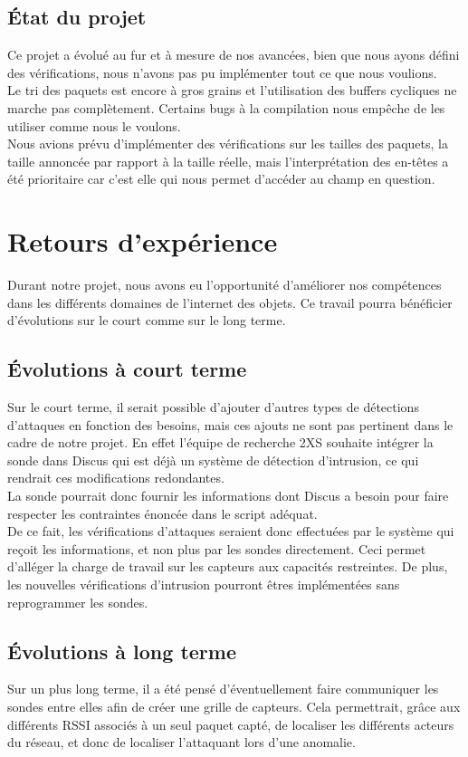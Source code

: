 	\subsection{État du projet}
		Ce projet a évolué au fur et à mesure de nos avancées, bien que nous ayons défini des vérifications, nous n'avons pas pu implémenter tout ce que nous voulions.\\
		Le tri des paquets est encore à gros grains et l'utilisation des buffers cycliques ne marche pas complètement. Certains bugs à la compilation nous empêche de les utiliser comme nous le voulons.\\
		Nous avions prévu d'implémenter des vérifications sur les tailles des paquets, la taille annoncée par rapport à la taille réelle, mais l'interprétation des en-têtes a été prioritaire car c'est elle qui nous permet d'accéder au champ en question.

\section{Retours d'expérience} %
    Durant notre projet, nous avons eu l'opportunité d'améliorer nos compétences dans les différents domaines de l'internet des objets. Ce travail pourra bénéficier d'évolutions sur le court comme sur le long terme.
    
	\subsection{Évolutions à court terme} %
	Sur le court terme, il serait possible d'ajouter d'autres types de détections d'attaques en fonction des besoins, mais ces ajouts ne sont pas pertinent dans le cadre de notre projet. En effet l'équipe de recherche 2XS souhaite intégrer la sonde dans Discus qui est déjà un système de détection d'intrusion, ce qui rendrait ces modifications redondantes.\\
	La sonde pourrait donc fournir les informations dont Discus a besoin pour faire respecter les contraintes énoncée dans le script adéquat.\\ 
	De ce fait, les vérifications d'attaques seraient donc effectuées par le système qui reçoit les informations, et non plus par les sondes directement. Ceci permet d'alléger la charge de travail sur les capteurs aux capacités restreintes. De plus, les nouvelles vérifications d'intrusion pourront êtres implémentées sans reprogrammer les sondes.
	\subsection{Évolutions à long terme} %
	Sur un plus long terme, il a été pensé d'éventuellement faire communiquer les sondes entre elles afin de créer une grille de capteurs.
	Cela permettrait, grâce aux différents RSSI associés à un seul paquet capté, de localiser les différents acteurs du réseau, et donc de localiser l'attaquant lors d'une anomalie.
